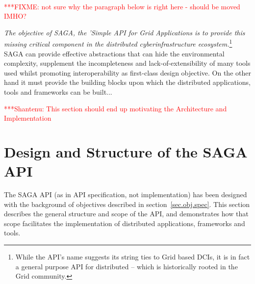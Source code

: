 \documentclass[a4paper,12pt]{article}
\newcommand{\jhanote}[1]{  {\textcolor{red}  { ***Shantenu: #1 }}}
\newcommand{\fixme}[1]{    {\textcolor{red}  { ***FIXME:    #1 }}}
\newcommand{\jhanote}[1]{}
\newcommand{\fixme}[1]{}
\newcommand{\dn}{\vspace*{+1.0em}}
\begin{document}
% 
% 
% 
%   
%   


 \dn\hrulefill\\
 \fixme{not sure why the paragraph below is right here - should be
 moved IMHO?}

 {\it The objective of SAGA, the 'Simple API for Grid Applications is
 to provide this missing critical component in the distributed
 cyberinfrastructure ecosystem.}\footnote{While the API's name
 suggests its string ties to Grid based DCIs, it is in fact a general
 purpose API for distributed -- which is historically rooted in the
 Grid community.}  SAGA can provide effective abstractions that can
 hide the environmental complexity, supplement the incompleteness and
 lack-of-extensibility of many tools used whilst promoting
 interoperability as first-class design objective.  On the other hand
 it must provide the building blocks upon which the distributed
 applications, tools and frameworks can be built...

\jhanote{This section should end up motivating the Architecture and
 Implementation}


% 
\section{Design and Structure of the SAGA API}
\label{sec.api}

 The SAGA API (as in API specification, not implementation) has been
 designed with the background of objectives described in
 section~\ref{sec.obj.spec}.  This section describes the
 general structure and scope of the API, and demonstrates how that
 scope facilitates the implementation of distributed applications,
 frameworks and tools.
\end{document}
